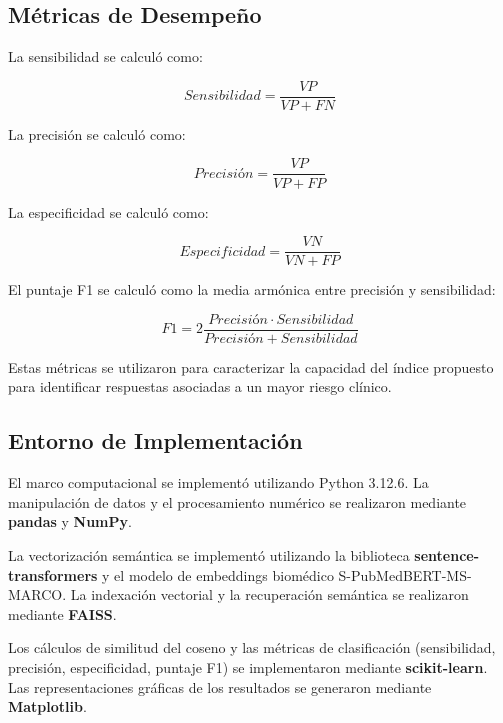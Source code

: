 \documentclass[final,11pt,3p]{elsarticle}
\begin{document}
\subsection{Métricas de Desempeño}
\label{S:2.11}

La sensibilidad se calculó como:

\begin{equation}
Sensibilidad =
\frac{VP}{VP+FN}
\label{eq:sensitivity}
\end{equation}

La precisión se calculó como:

\begin{equation}
Precisión =
\frac{VP}{VP+FP}
\label{eq:precision}
\end{equation}

La especificidad se calculó como:

\begin{equation}
Especificidad =
\frac{VN}{VN+FP}
\label{eq:specificity}
\end{equation}

El puntaje F1 se calculó como la media armónica entre precisión y sensibilidad:

\begin{equation}
F1 =
2\frac{Precisión \cdot Sensibilidad}
{Precisión + Sensibilidad}
\label{eq:f1}
\end{equation}

Estas métricas se utilizaron para caracterizar la capacidad del índice propuesto para identificar respuestas asociadas a un mayor riesgo clínico.

\subsection{Entorno de Implementación}
\label{S:2.12}

El marco computacional se implementó utilizando Python 3.12.6. La manipulación de datos y el procesamiento numérico se realizaron mediante \textbf{pandas} y \textbf{NumPy}.

La vectorización semántica se implementó utilizando la biblioteca \textbf{sentence-transformers} y el modelo de embeddings biomédico S-PubMedBERT-MS-MARCO. La indexación vectorial y la recuperación semántica se realizaron mediante \textbf{FAISS}.

Los cálculos de similitud del coseno y las métricas de clasificación (sensibilidad, precisión, especificidad, puntaje F1) se implementaron mediante \textbf{scikit-learn}. Las representaciones gráficas de los resultados se generaron mediante \textbf{Matplotlib}.
\end{document}

